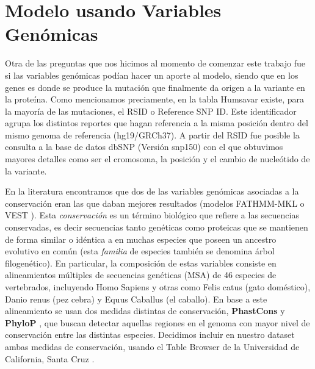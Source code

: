 \newpage

\section{Modelo usando Variables Genómicas}

Otra de las preguntas que nos hicimos al momento de comenzar este trabajo fue si las variables genómicas podían hacer un aporte al modelo, siendo que en los genes es donde se produce la mutación que finalmente da origen a la variante en la proteína. Como mencionamos preciamente, en la tabla Humsavar existe, para la mayoría de las mutaciones, el RSID o Reference SNP ID. Este identificador agrupa los distintos reportes que hagan referencia a la misma posición dentro del mismo genoma de referencia (hg19/GRCh37). A partir del RSID fue posible la consulta a la base de datos dbSNP (Versión snp150) con el que obtuvimos mayores detalles como ser el cromosoma, la posición y el cambio de nucleótido de la variante. 

En la literatura encontramos que dos de las variables genómicas asociadas a la conservación eran las que daban mejores resultados (modelos FATHMM-MKL \cite{Shihab2015} o VEST \cite{Carter2013}). Esta \textit{conservación} es un término biológico que refiere a las secuencias conservadas, es decir secuencias tanto genéticas como proteicas que se mantienen de forma similar o idéntica a en muchas especies que poseen un ancestro evolutivo en común (esta \textit{familia} de especies también se denomina árbol filogenético). En particular, la composición de estas variables consiste en alineamientos múltiples de secuencias genéticas (MSA) de 46 especies de vertebrados, incluyendo Homo Sapiens y otras como Felis catus (gato doméstico), Danio renus (pez cebra) y Equus Caballus (el caballo). En base a este alineamiento se usan dos medidas distintas de conservación, \textbf{PhastCons} \cite{siepel2005evolutionarily} y \textbf{PhyloP} \cite{Pollard2010}, que buscan detectar aquellas regiones en el genoma con mayor nivel de conservación entre las distintas especies. Decidimos incluir en nuestro dataset ambas medidas de conservación, usando el Table Browser de la Universidad de California, Santa Cruz \cite{Karolchik2004}.

